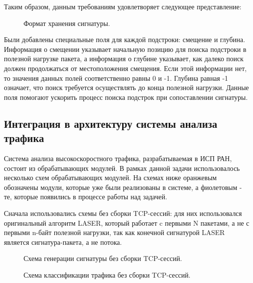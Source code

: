 Таким образом, данным требованиям удовлетворяет следующее представление:

\begin{figure}[H]
    \begin{center}
        
        \caption{Формат хранения сигнатуры.}
    \end{center}
\end{figure}

Были добавлены специальные поля для каждой подстроки: смещение и глубина.
Информация о смещении указывает начальную позицию для поиска подстроки в полезной нагрузке пакета,
а информация о глубине указывает, как далеко поиск должен продолжаться от местоположения смещения.
Если этой информации нет, то значения данных полей соответственно равны 0 и -1.
Глубина равная -1 означает, что поиск требуется осуществлять до конца полезной нагрузки.
Данные поля помогают ускорить процесс поиска подстрок при сопоставлении сигнатуры.

\subsection{Интеграция в архитектуру системы анализа трафика}

Система анализа высокоскоростного трафика, разрабатываемая в ИСП РАН, состоит из обрабатывающих модулей. В рамках данной задачи использовалось несколько схем обрабатывающих модулей.
На схемах ниже оранжевым обозначены модули, которые уже были реализованы в системе, а фиолетовым - те, которые появились в процессе работы над задачей.

Сначала использовались схемы без сборки TCP-сессий: для них использовался оригинальный алгоритм LASER,
который работает c первыми N пакетами, а не с первыми n-байт полезной нагрузки, так как конечной сигнатурой LASER является сигнатура-пакета, а не потока.

\begin{figure}[H]
    \begin{center}
        
        \caption{Схема генерации сигнатуры без сборки TCP-сессий.}
    \end{center}
\end{figure}

\begin{figure}[H]
    \begin{center}
        
        \caption{Схема классификации трафика без сборки TCP-сессий.}
    \end{center}
\end{figure}

